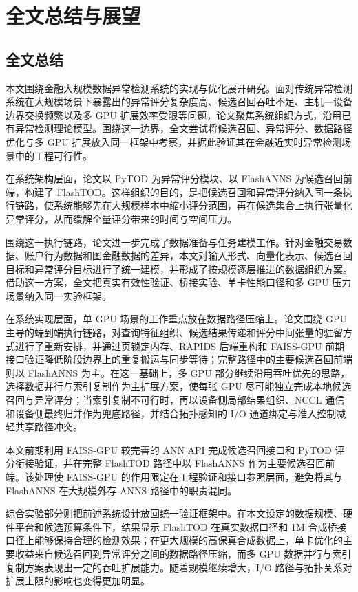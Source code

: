
\chapter{全文总结与展望}

\section{全文总结}

本文围绕金融大规模数据异常检测系统的实现与优化展开研究。面对传统异常检测系统在大规模场景下暴露出的异常评分复杂度高、候选召回吞吐不足、主机---设备边界交换频繁以及多 GPU 扩展效率受限等问题，论文聚焦系统组织方式，沿用已有异常检测理论模型。围绕这一边界，全文尝试将候选召回、异常评分、数据路径优化与多 GPU 扩展放入同一框架中考察，并据此验证其在金融近实时异常检测场景中的工程可行性。

在系统架构层面，论文以 PyTOD 为异常评分模块、以 FlashANNS 为候选召回前端，构建了 FlashTOD。这样组织的目的，是把候选召回和异常评分纳入同一条执行链路，使系统能够先在大规模样本中缩小评分范围，再在候选集合上执行张量化异常评分，从而缓解全量评分带来的时间与空间压力。

围绕这一执行链路，论文进一步完成了数据准备与任务建模工作。针对金融交易数据、账户行为数据和图金融数据的差异，本文对输入形式、向量化表示、候选召回目标和异常评分目标进行了统一建模，并形成了按规模逐层推进的数据组织方案。借助这一方案，全文把真实有效性验证、桥接实验、单卡性能口径和多 GPU 压力场景纳入同一实验框架。

在系统实现层面，单 GPU 场景的工作重点放在数据路径压缩上。论文围绕 GPU 主导的端到端执行链路，对查询特征组织、候选结果传递和评分中间张量的驻留方式进行了重新安排，并通过页锁定内存、RAPIDS 后端重构和 FAISS-GPU 前期接口验证降低阶段边界上的重复搬运与同步等待；完整路径中的主要候选召回前端则以 FlashANNS 为主。在这一基础上，多 GPU 部分继续沿用吞吐优先的思路，选择数据并行与索引复制作为主扩展方案，使每张 GPU 尽可能独立完成本地候选召回与异常评分；当索引复制不可行时，再以设备侧局部结果组织、NCCL 通信和设备侧最终归并作为兜底路径，并结合拓扑感知的 I/O 通道绑定与准入控制减轻共享路径冲突。

本文前期利用 FAISS-GPU 较完善的 ANN API 完成候选召回接口和 PyTOD 评分衔接验证，并在完整 FlashTOD 路径中以 FlashANNS 作为主要候选召回前端。该处理使 FAISS-GPU 的作用限定在工程验证和接口参照层面，避免将其与 FlashANNS 在大规模外存 ANNS 路径中的职责混同。

综合实验部分则把前述系统设计放回统一验证框架中。在本文设定的数据规模、硬件平台和候选预算条件下，结果显示 FlashTOD 在真实数据口径和 1M 合成桥接口径上能够保持合理的检测效果；在更大规模的高保真合成数据上，单卡优化的主要收益来自候选召回到异常评分之间的数据路径压缩，而多 GPU 数据并行与索引复制方案表现出一定的吞吐扩展能力。随着规模继续增大，I/O 路径与拓扑关系对扩展上限的影响也变得更加明显。

